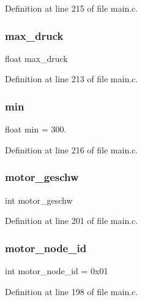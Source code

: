 Definition at line 215 of file main.\+c.

\mbox{\label{main_8c_a4403857d84098dcee3088f476a2a2b34}} 
\subsubsection{max\+\_\+druck}
{\footnotesize\ttfamily float max\+\_\+druck}



Definition at line 213 of file main.\+c.

\mbox{\label{main_8c_ad2e88d75f808e6d4e78d48bceb10c336}} 
\subsubsection{min}
{\footnotesize\ttfamily float min = 300.}



Definition at line 216 of file main.\+c.

\mbox{\label{main_8c_aac4d60376dc2c81df7018aa664eddc7e}} 
\subsubsection{motor\+\_\+geschw}
{\footnotesize\ttfamily int motor\+\_\+geschw}



Definition at line 201 of file main.\+c.

\mbox{\label{main_8c_a56f8652edaf340deb706226d69252c1a}} 
\subsubsection{motor\+\_\+node\+\_\+id}
{\footnotesize\ttfamily int motor\+\_\+node\+\_\+id = 0x01}



Definition at line 198 of file main.\+c.

\mbox{\label{main_8c_aefd93152b86f130afb4f6e1eef7fd452}} 
